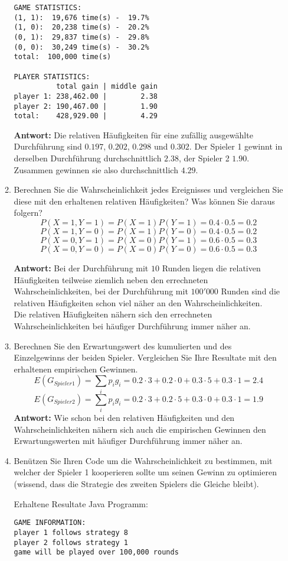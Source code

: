 \documentclass[12pt,a4paper]{article}
\begin{document}
\begin{enumerate}
\begin{enumerate}
\begin{verbatim}
GAME STATISTICS:
(1, 1):  19,676 time(s) -  19.7%
(1, 0):  20,238 time(s) -  20.2%
(0, 1):  29,837 time(s) -  29.8%
(0, 0):  30,249 time(s) -  30.2%
total:  100,000 time(s)

PLAYER STATISTICS:
          total gain | middle gain
player 1: 238,462.00 |        2.38
player 2: 190,467.00 |        1.90
total:    428,929.00 |        4.29
\end{verbatim}
\textbf{Antwort:} Die relativen Häufigkeiten für eine zufällig ausgewählte Durchführung sind $0.197$, $0.202$, $0.298$ und $0.302$.
Der Spieler 1 gewinnt in derselben Durchführung durchschnittlich $2.38$, der Spieler 2 $1.90$.
Zusammen gewinnen sie also durchschnittlich $4.29$.
\newpage

\item Berechnen Sie die Wahrscheinlichkeit jedes Ereignisses und vergleichen Sie diese mit den erhaltenen relativen Häufigkeiten?
Was können Sie daraus folgern?\\
$$P(X = 1, Y = 1) = P(X = 1) P(Y = 1) = 0.4 \cdot 0.5 = 0.2$$
$$P(X = 1, Y = 0) = P(X = 1) P(Y = 0) = 0.4 \cdot 0.5 = 0.2$$
$$P(X = 0, Y = 1) = P(X = 0) P(Y = 1) = 0.6 \cdot 0.5 = 0.3$$
$$P(X = 0, Y = 0) = P(X = 0) P(Y = 0) = 0.6 \cdot 0.5 = 0.3$$

\textbf{Antwort:} Bei der Durchführung mit $10$ Runden liegen die relativen Häufigkeiten teilweise ziemlich neben den errechneten Wahrscheinlichkeiten,
bei der Durchführung mit $100'000$ Runden sind die relativen Häufigkeiten schon viel näher an den Wahrscheinlichkeiten.\\
Die relativen Häufigkeiten nähern sich den errechneten Wahrscheinlichkeiten bei häufiger Durchführung immer näher an.

\item Berechnen Sie den Erwartungswert des kumulierten und des Einzelgewinns der beiden Spieler.
Vergleichen Sie Ihre Resultate mit den erhaltenen empirischen Gewinnen.
$$E(G_{Spieler 1}) = \sum_{i} p_i g_i = 0.2 \cdot 3 + 0.2 \cdot 0 + 0.3 \cdot 5 + 0.3 \cdot 1 = 2.4$$
$$E(G_{Spieler 2}) = \sum_{i} p_i g_i = 0.2 \cdot 3 + 0.2 \cdot 5 + 0.3 \cdot 0 + 0.3 \cdot 1 = 1.9$$
\textbf{Antwort:} Wie schon bei den relativen Häufigkeiten und den Wahrscheinlichkeiten nähern sich auch die empirischen Gewinnen den Erwartungswerten mit häufiger Durchführung immer näher an.

\item Benützen Sie Ihren Code um die Wahrscheinlichkeit zu bestimmen, mit welcher der Spieler 1 kooperieren sollte um seinen Gewinn zu optimieren (wissend, dass die Strategie des zweiten Spielers die Gleiche bleibt).
\begin{center}Erhaltene Resultate Java Programm:\end{center}
\begin{verbatim}
GAME INFORMATION:
player 1 follows strategy 8
player 2 follows strategy 1
game will be played over 100,000 rounds


\end{verbatim}
\end{enumerate}
\end{enumerate}
\end{document}
